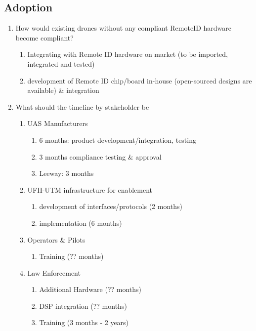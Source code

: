 \documentclass{ua_wgs_questionnaire}
\begin{document}
\begin{Form}[action={http://localhost:8000}, encoding=html, method=post]
\section{Adoption}
\begin{enumerate}
\item How would existing drones without any compliant RemoteID hardware
become compliant?
\begin{enumerate}
\item Integrating with Remote ID hardware on market (to be imported, integrated
and tested)
\item development of Remote ID chip/board in-house (open-sourced designs
{} are available) \& integration
\end{enumerate}
\item What should the timeline by stakeholder be
\begin{enumerate}
\item UAS Manufacturers
\begin{enumerate}
\item 6 months: product development/integration, testing
\item 3 months compliance testing \& approval
\item Leeway: 3 months
\end{enumerate}
\item UFII-UTM infrastructure for enablement
\begin{enumerate}
\item development of interfaces/protocols (2 months)
\item implementation (6 months)
\end{enumerate}
\item Operators \& Pilots
\begin{enumerate}
\item Training (?? months)
\end{enumerate}
\item Law Enforcement
\begin{enumerate}
\item Additional Hardware (?? months)
\item DSP integration (?? months)
\item Training (3 months - 2 years)
\end{enumerate}
\end{enumerate}
\end{enumerate}


\end{Form}
\end{document}
